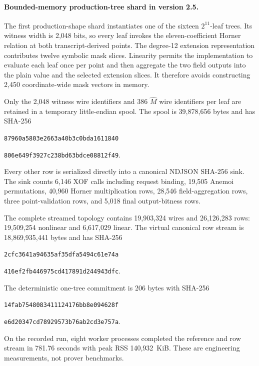 \documentclass[11pt]{article}
\begin{document}
\paragraph{Bounded-memory production-tree shard in version 2.5.}
The first production-shape shard instantiates one of the sixteen
$2^{11}$-leaf trees.  Its witness width is 2,048 bits, so every leaf invokes
the eleven-coefficient Horner relation at both transcript-derived points.  The
degree-12 extension representation contributes twelve symbolic mask slices.
Linearity permits the implementation to evaluate each leaf once per point and
then aggregate the two field outputs into the plain value and the selected
extension slices.  It therefore avoids constructing 2,450 coordinate-wide
mask vectors in memory.

Only the 2,048 witness wire identifiers and 386 $\widehat M$ wire identifiers
per leaf are retained in a temporary little-endian spool.  The spool is
39,878,656 bytes and has SHA-256
\begin{center}
\texttt{87960a5803e2663a40b3c0bda1611840}\par\vspace{-0.2em}
\texttt{806e649f3927c238bd63bdce08812f49}.
\end{center}
Every other row is serialized directly into a canonical NDJSON SHA-256 sink.
The sink counts 6,146 XOF calls including request binding, 19,505 Anemoi
permutations, 40,960 Horner multiplication rows, 28,546 field-aggregation
rows, three point-validation rows, and 5,018 final output-bitness rows.

The complete streamed topology contains 19,903,324 wires and 26,126,283 rows:
19,509,254 nonlinear and 6,617,029 linear.  The virtual canonical row stream is
18,869,935,441 bytes and has SHA-256
\begin{center}
\texttt{2cfc3641a94635af35dfa5494c61e74a}\par\vspace{-0.2em}
\texttt{416ef2fb446975cd417891d244943dfc}.
\end{center}
The deterministic one-tree commitment is 206 bytes with SHA-256
\begin{center}
\texttt{14fab7548083411124176bb8e094628f}\par\vspace{-0.2em}
\texttt{e6d20347cd78929573b76ab2cd3e757a}.
\end{center}
On the recorded run, eight worker processes completed the reference and row
stream in 781.76 seconds with peak RSS 140,932~KiB.  These are engineering
measurements, not prover benchmarks.
\end{document}
